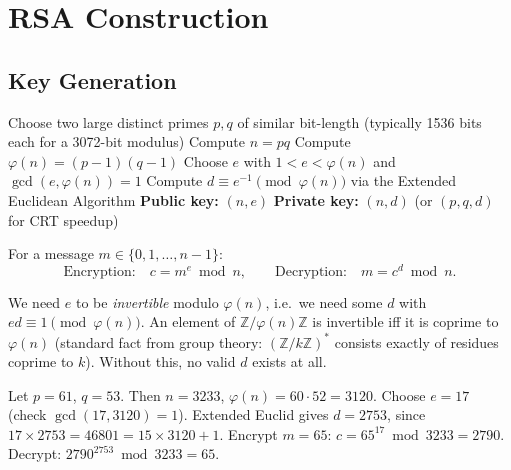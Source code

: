 \newpage
\section{RSA Construction}

\subsection{Key Generation}

\begin{algorithm}[h]
\caption{RSA Key Generation}
\begin{algorithmic}[1]
\State Choose two large distinct primes $p, q$ of similar bit-length (typically 1536 bits each for a 3072-bit modulus)
\State Compute $n = pq$
\State Compute $\varphi(n) = (p-1)(q-1)$
\State Choose $e$ with $1 < e < \varphi(n)$ and $\gcd(e, \varphi(n)) = 1$
\State Compute $d \equiv e^{-1} \pmod{\varphi(n)}$ via the Extended Euclidean Algorithm
\State \textbf{Public key:} $(n, e)$ \qquad \textbf{Private key:} $(n, d)$ \quad (or $(p,q,d)$ for CRT speedup)
\end{algorithmic}
\end{algorithm}

\begin{definition}
For a message $m \in \{0, 1, \dots, n-1\}$:
\[
\text{Encryption:} \quad c = m^{e} \bmod n, \qquad \text{Decryption:} \quad m = c^{d} \bmod n.
\]
\end{definition}

\begin{remark}[Why $\gcd(e,\varphi(n))=1$ is required]
We need $e$ to be \emph{invertible} modulo $\varphi(n)$, i.e.\ we need some $d$ with $ed \equiv 1 \pmod{\varphi(n)}$. An element of $\mathbb{Z}/\varphi(n)\mathbb{Z}$ is invertible iff it is coprime to $\varphi(n)$ (standard fact from group theory: $(\mathbb{Z}/k\mathbb{Z})^{*}$ consists exactly of residues coprime to $k$). Without this, no valid $d$ exists at all.
\end{remark}

\begin{example}
Let $p = 61$, $q = 53$. Then $n = 3233$, $\varphi(n) = 60 \cdot 52 = 3120$.
Choose $e = 17$ (check $\gcd(17,3120)=1$). Extended Euclid gives $d = 2753$, since $17 \times 2753 = 46801 = 15 \times 3120 + 1$.
Encrypt $m = 65$: $c = 65^{17} \bmod 3233 = 2790$. Decrypt: $2790^{2753} \bmod 3233 = 65$. \checkmark
\end{example}

